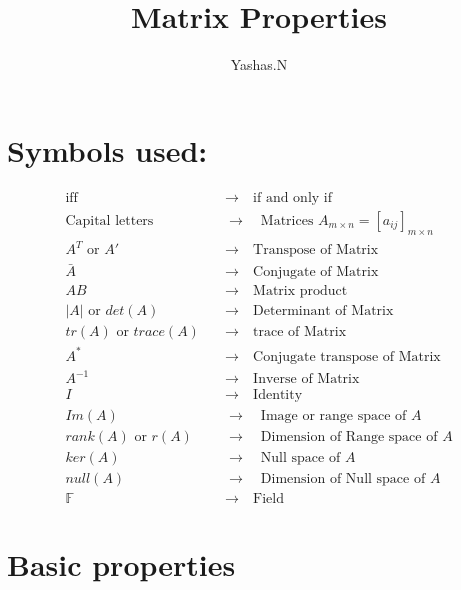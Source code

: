 \documentclass[11pt]{extarticle}
\author{Yashas.N}
\title{Matrix Properties}
\date{}
\newcommand{\w}[1]{\text{#1}}
\begin{document}
	\maketitle
	\boldmath
	
\begin{multicols}{2}
	\tableofcontents
\section*{Symbols used:}
{\scriptsize 
	\begin{align*}
	\text{iff} \quad&\rightarrow\quad\text{if and only if}\\
	\text{Capital letters}\quad&\rightarrow\quad\text{Matrices }A_{m\times n}=[a_{ij}]_{m \times n}\\
	A^T \text{ or } A'\quad&\rightarrow\quad\text{Transpose of Matrix}\\
	\bar{A}\quad&\rightarrow\quad\text{Conjugate of Matrix}\\
	AB\quad&\rightarrow\quad\text{Matrix product}\\
	|A|\text{ or } det(A) \quad&\rightarrow\quad\text{Determinant of Matrix}\\
	tr(A)\text{ or }trace(A) \quad&\rightarrow\quad\text{trace of Matrix}\\
	A^*\quad&\rightarrow\quad\text{Conjugate transpose of Matrix}\\
	A^{-1} \quad&\rightarrow\quad\text{Inverse of Matrix}\\
	I \quad&\rightarrow\quad\text{Identity}\\
	Im(A) \quad&\rightarrow\quad \text{Image or range space of }A\\
	rank(A)\w{ or } r(A)\quad&\rightarrow\quad \text{Dimension of Range space of }A\\
	ker(A) \quad&\rightarrow\quad \text{Null space of }A\\
	null(A) \quad&\rightarrow\quad \text{Dimension of Null space of }A\\ 
	\mathbb{F}  \quad&\rightarrow\quad \text{Field}
\end{align*}}


\section{Basic properties}


\end{multicols}
\end{document}
